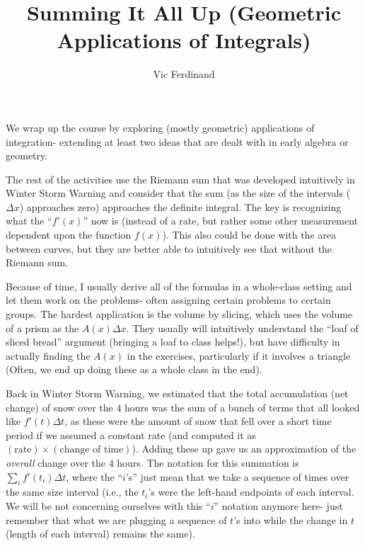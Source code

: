 \documentclass{ximera}
\author{Vic Ferdinand}
\title{Summing It All Up (Geometric Applications of Integrals)}
\begin{document}
\begin{abstract}
\end{abstract}
\maketitle

\begin{instructorIntro}
We wrap up the course by exploring (mostly geometric) applications of integration- extending at least two ideas that are dealt with in early algebra or geometry.  

The rest of the activities use the Riemann sum that was developed intuitively in Winter Storm Warning and consider that the sum (as the size of the intervals ($\Delta x$) approaches zero) approaches the definite integral.  The key is recognizing what the ``$f'(x)$'' now is (instead of a rate, but rather some other measurement dependent upon the function $f(x)$).  This also could be done with the area between curves, but they are better able to intuitively see that without the Riemann sum. 

Because of time, I usually derive all of the formulas in a whole-class setting and let them work on the problems- often assigning certain problems to certain groups. The hardest application is the volume by slicing, which uses the volume of a prism as the $A(x) \Delta x$.  They usually will intuitively understand the ``loaf of sliced bread'' argument (bringing a loaf to class helps!), but have difficulty in actually finding the $A(x)$ in the exercises, particularly if it involves a triangle (Often, we end up doing these as a whole class in the end).

\end{instructorIntro}


Back in Winter Storm Warning, we estimated that the total accumulation (net change) of snow over the $4$ hours was the sum of a bunch of terms that all looked like  $f'(t) \Delta t$, as these were the amount of snow that fell over a short time period if we assumed a constant rate (and computed it as $(\text{rate}) \times (\text{change of time})$).  Adding these up gave us an approximation of the {\em overall} change over the $4$ hours.  The notation for this summation is  $\sum_i f'(t_i)\Delta t$, where the ``$i$'s'' just mean that we take a sequence of times over the same size interval (i.e., the  $t_i$'s were the left-hand endpoints of each interval. We will be not concerning ourselves with this ``$i$'' notation anymore here- just remember that what we are plugging a sequence of $t$'s into  while the change in $t$ (length of each interval) remains the same).  
\end{document}

